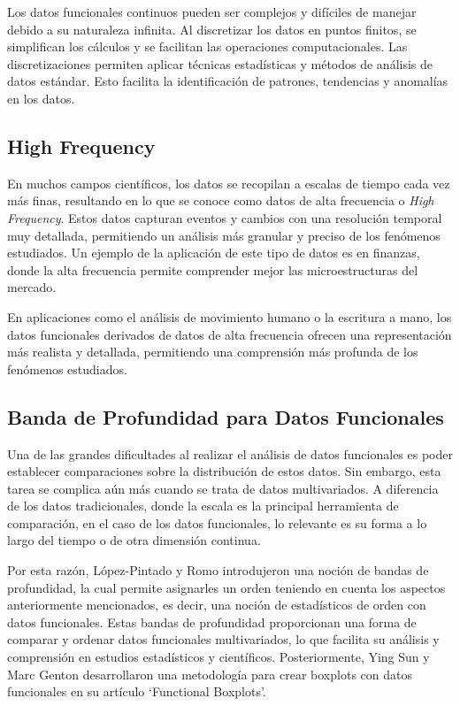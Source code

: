 Los datos funcionales continuos pueden ser complejos y difíciles de manejar debido a su naturaleza infinita. Al discretizar los datos en puntos finitos, se simplifican los cálculos y se facilitan las operaciones computacionales. Las discretizaciones permiten aplicar técnicas estadísticas y métodos de análisis de datos estándar. Esto facilita la identificación de patrones, tendencias y anomalías en los datos.

\subsection{High Frequency}

En muchos campos científicos, los datos se recopilan a escalas de tiempo cada vez más finas, resultando en lo que se conoce como datos de alta frecuencia o \textit{High Frequency}. Estos datos capturan eventos y cambios con una resolución temporal muy detallada, permitiendo un análisis más granular y preciso de los fenómenos estudiados. Un ejemplo de la aplicación de este tipo de datos es en finanzas, donde la alta frecuencia permite comprender mejor las microestructuras del mercado. \cite{Tsay2000}

 En aplicaciones como el análisis de movimiento humano o la escritura a mano, los datos funcionales derivados de datos de alta frecuencia ofrecen una representación más realista y detallada, permitiendo una comprensión más profunda de los fenómenos estudiados.

 

\subsection{Banda de Profundidad para Datos Funcionales}

Una de las grandes dificultades al realizar el análisis de datos funcionales es poder establecer comparaciones sobre la distribución de estos datos. Sin embargo, esta tarea se complica aún más cuando se trata de datos multivariados. A diferencia de los datos tradicionales, donde la escala es la principal herramienta de comparación, en el caso de los datos funcionales, lo relevante es su forma a lo largo del tiempo o de otra dimensión continua.

Por esta razón, López-Pintado y Romo introdujeron una noción de bandas de profundidad, la cual permite asignarles un orden teniendo en cuenta los aspectos anteriormente mencionados, es decir, una noción de estadísticos de orden con datos funcionales. Estas bandas de profundidad proporcionan una forma de comparar y ordenar datos funcionales multivariados, lo que facilita su análisis y comprensión en estudios estadísticos y científicos. Posteriormente, Ying Sun y Marc Genton desarrollaron una metodología para crear boxplots con datos funcionales en su artículo `Functional Boxplots'. \cite{boxplotFun}

